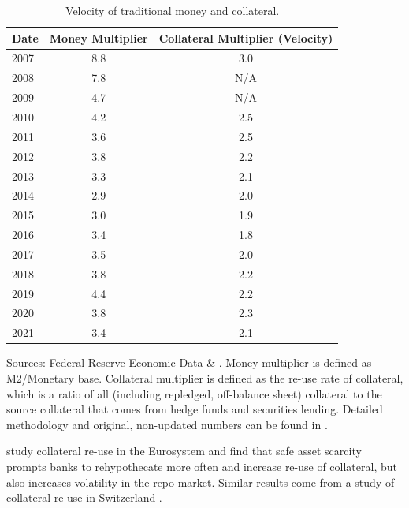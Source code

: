 \documentclass[11pt,a4paper,english,oneside]{article}
\begin{document}
\begin{table}[!h] \centering
\begin{threeparttable}
\caption{Velocity of traditional money and collateral.}
\begin{tabular}{l|cc}
\toprule
  Date & Money Multiplier & Collateral Multiplier (Velocity)\\
\midrule
  2007 & 8.8 & 3.0 \\
  2008 & 7.8 & N/A \\
  2009 & 4.7 & N/A \\
  2010 & 4.2 & 2.5 \\
  2011 & 3.6 & 2.5 \\
  2012 & 3.8 & 2.2 \\
  2013 & 3.3 & 2.1 \\
  2014 & 2.9 & 2.0 \\
  2015 & 3.0 & 1.9 \\
  2016 & 3.4 & 1.8 \\
  2017 & 3.5 & 2.0 \\
  2018 & 3.8 & 2.2 \\
  2019 & 4.4 & 2.2 \\
  2020 & 3.8 & 2.3 \\
  2021 & 3.4 & 2.1 \\
\bottomrule
\end{tabular}
  Sources: Federal Reserve Economic Data \& \citet{singh2022}. Money multiplier is defined as M2/Monetary base. Collateral multiplier is defined as the re-use rate of collateral, which is a ratio of all (including repledged, off-balance sheet) collateral to the source collateral that comes from hedge funds and securities lending. Detailed methodology and original, non-updated numbers can be found in \citet{singh2011b}.
\label{table:velocity}
\end{threeparttable}
\end{table}

\citet{jank2021} study collateral re-use in the Eurosystem and find that safe asset scarcity prompts banks to rehypothecate more often and increase re-use of collateral, but also increases volatility in the repo market. Similar results come from a study of collateral re-use in Switzerland \citep{fuhrer2016}. 
\end{document}
